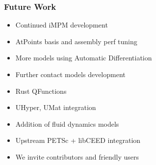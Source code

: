 \documentclass{beamer}
\begin{document}
\begin{frame}
\begin{center}
\frametitle{Future Work}

\begin{itemize}

\item Continued iMPM development\\

\item AtPoints basis and assembly perf tuning\\

\item More models using Automatic Differentiation\\

\item Further contact models development\\

\item Rust QFunctions\\

\item UHyper, UMat integration\\

\item Addition of fluid dynamics models\\

\item Upstream PETSc + libCEED integration\\

\item We invite contributors and friendly users\\

\end{itemize}

\end{center}
\end{frame}
 
\end{document}
